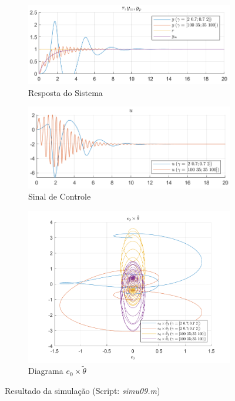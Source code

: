 \documentclass[10pt]{article}
\begin{document}
\begin{figure}[h!]
    \begin{subfigure}[b]{0.45\textwidth}
        \centering
        \includegraphics[width=\textwidth]{img/fig09c.png}
        \caption{Resposta do Sistema}
    \end{subfigure}
    \begin{subfigure}[b]{0.45\textwidth}
        \centering
        \includegraphics[width=\textwidth]{img/fig09e.png}
        \caption{Sinal de Controle}
    \end{subfigure}

    \vspace{0.5cm}

    \begin{subfigure}[b]{0.4\textwidth}
        \centering
        \includegraphics[width=\textwidth]{img/fig09d.png}
        \caption{Diagrama $e_0 \times \tilde{\theta}$}
    \end{subfigure}

    \caption{Resultado da simulação (Script: \textit{simu09.m})}
    \label{fig:sim9}
\end{figure}
\end{document}
